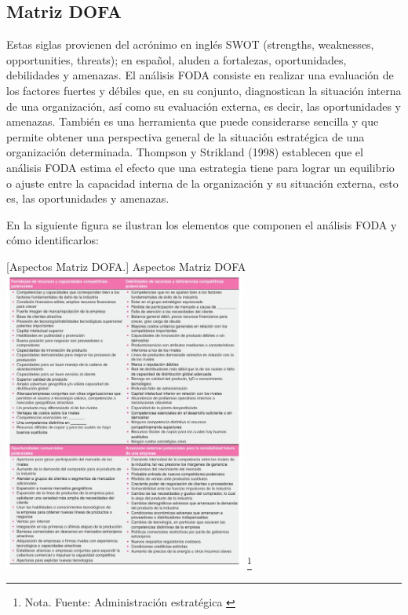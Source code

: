 \color{black}
\subsection{Matriz DOFA}
Estas siglas provienen del acrónimo en inglés SWOT (strengths, weaknesses, opportunities, threats); en español, aluden a fortalezas, oportunidades, debilidades y amenazas. El análisis FODA consiste en realizar una evaluación de los factores fuertes y débiles que, en su conjunto, diagnostican la situación interna de una organización, así como su evaluación externa, es decir, las oportunidades y amenazas. También es una herramienta que puede considerarse sencilla y que permite obtener una perspectiva general de la situación estratégica de una organización determinada. Thompson y Strikland (1998) establecen que el análisis FODA estima el efecto que una estrategia tiene para lograr un equilibrio o ajuste entre la capacidad interna de la organización y su situación externa, esto es, las oportunidades y amenazas. \cite{Dofa}

En la siguiente figura se ilustran los elementos que componen el análisis FODA y cómo identificarlos:

\vspace{2mm}
\begin{minipage}{0.9\textwidth}
\centering
{}[{Aspectos Matriz DOFA.}]{ Aspectos Matriz DOFA }
\label{dofa}
\includegraphics[width=0.6\textwidth]{Content/Images/dofa-ejemplo.jpeg}
\footnote{Nota. \textup{Fuente: Administración estratégica
\cite{administracion-estrategica}}}
\end{minipage}

